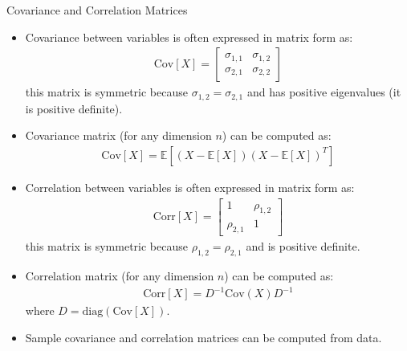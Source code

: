 \documentclass[9pt]{beamer}
\begin{document}
%
\begin{frame}{Covariance and Correlation Matrices}

\begin{itemize}
\item Covariance between variables is often expressed in matrix form as: 
\begin{align*}
\textrm{Cov}[X]=\left[\begin{array}{cc}\sigma_{1,1}&\sigma_{1,2}\\ \sigma_{2,1}&\sigma_{2,2}\end{array}\right]
\end{align*}
this matrix is symmetric because $\sigma_{1,2}=\sigma_{2,1}$ and has positive eigenvalues (it is positive definite).  

\item Covariance matrix (for any dimension $n$) can be computed as:
\begin{align*}
\textrm{Cov}[X]=\mathbb{E}\left[(X-\mathbb{E}[X])(X-\mathbb{E}[X])^T\right]
\end{align*}

\item Correlation between variables is often expressed in matrix form as: 
\begin{align*}
\textrm{Corr}[X]=\left[\begin{array}{cc}1&\rho_{1,2}\\ \rho_{2,1}&1\end{array}\right]
\end{align*}
this matrix is symmetric because $\rho_{1,2}=\rho_{2,1}$ and is positive definite.  

\item Correlation matrix (for any dimension $n$) can be computed as:
\begin{align*}
\textrm{Corr}[X]=D^{-1}\textrm{Cov}(X) D^{-1}
\end{align*}
where $D=\textrm{diag}(\textrm{Cov}[X])$. 
\item Sample covariance and correlation matrices can be computed from data. 
\end{itemize}


\end{frame}
\end{document}
